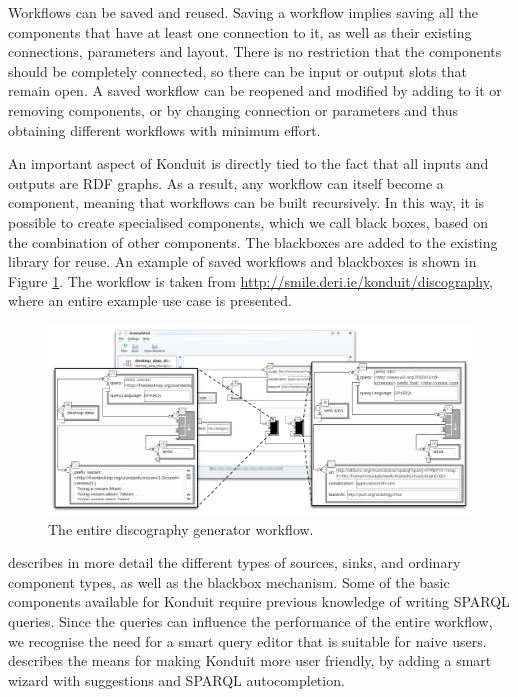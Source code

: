 Workflows can be saved and reused. Saving a workflow implies saving all the components that have at least one connection to it, as well as their existing connections, parameters and layout. There is no restriction that the components should be completely connected, so there can be input or output slots that remain open. A saved workflow can be reopened and modified by adding to it or removing components, or by changing connection or parameters and thus obtaining different workflows with minimum effort.

An important aspect of Konduit is directly tied to the fact that all inputs and outputs are RDF graphs. As a result, any workflow can itself become a component, meaning that workflows can be built recursively. In this way, it is possible to create specialised components, which we call black boxes, based on the combination of other components. The blackboxes are added to the existing library for reuse. An example of saved workflows and blackboxes is shown in Figure \ref{fig:discography_generator}. The workflow is taken from \url{http://smile.deri.ie/konduit/discography}, where an entire example use case is presented.

\begin{figure}[!ht]
 \centering
 \includegraphics[width=1.0\linewidth]{chapters/core/img/discography}
 \caption{The entire discography generator workflow.}
 \label{fig:discography_generator}
\end{figure}

\cite{Dragan2009b} describes in more detail the different types of sources, sinks, and ordinary component types, as well as the blackbox mechanism. 
Some of the basic components available for Konduit require previous knowledge of writing SPARQL queries. Since the queries can influence the performance of the entire workflow, we recognise the need for a smart query editor that is suitable for naive users. \cite{Ambrus2010} describes the means for making Konduit more user friendly, by adding a smart wizard with suggestions and SPARQL autocompletion. 
